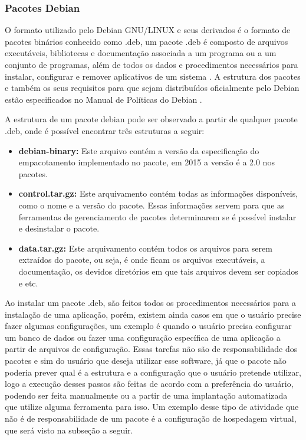 \subsubsection{Pacotes Debian}

O formato utilizado pelo Debian GNU/LINUX e seus derivados é o formato de pacotes
binários conhecido como .deb, um pacote .deb é composto de arquivos executáveis,
bibliotecas e documentação associada a um programa ou a um conjunto de programas,
além de todos os dados e procedimentos necessários para instalar, configurar e remover
aplicativos de um sistema \cite{araujo2011apprecommender}. A estrutura dos pacotes
e também os seus requisitos para que sejam distribuídos oficialmente pelo Debian
estão especificados no Manual de Políticas do Debian \cite{debian}.

A estrutura de um pacote debian pode ser observado a partir de qualquer pacote
.deb, onde é possível encontrar três estruturas a seguir:

\begin{itemize}
  \item \textbf{debian-binary:} Este arquivo contém a versão da especificação
  do empacotamento implementado no pacote, em 2015 a versão é a 2.0 nos pacotes.
  \item \textbf{control.tar.gz:} Este arquivamento contém todas as informações
   disponíveis, como o nome e a versão do pacote. Essas informações servem para
   que as ferramentas de gerenciamento de pacotes determinarem se é possível
   instalar e desinstalar o pacote.
   \item \textbf{data.tar.gz:} Este arquivamento contém todos os arquivos para
   serem extraídos do pacote, ou seja, é onde ficam os arquivos executáveis, a documentação,
   os devidos diretórios em que tais arquivos devem ser copiados e etc.
\end{itemize}

Ao instalar um pacote .deb, são feitos todos os procedimentos necessários para a instalação
de uma aplicação, porém, existem ainda casos em que o usuário precise fazer algumas
configurações, um exemplo é quando o usuário precisa configurar um banco de dados
ou fazer uma configuração específica de uma aplicação a partir de arquivos de configuração.
Essas tarefas não são de responsabilidade dos pacotes e sim do usuário que deseja utilizar esse
software, já que o pacote não poderia prever qual é a estrutura e a configuração
que o usuário pretende utilizar, logo a execução desses passos são feitas de
acordo com a preferência do usuário, podendo ser feita manualmente ou a partir
de uma implantação automatizada que utilize alguma ferramenta para isso. Um exemplo
desse tipo de atividade que não é de responsabilidade de um pacote é a configuração
de hospedagem virtual, que será visto na subseção a seguir.

